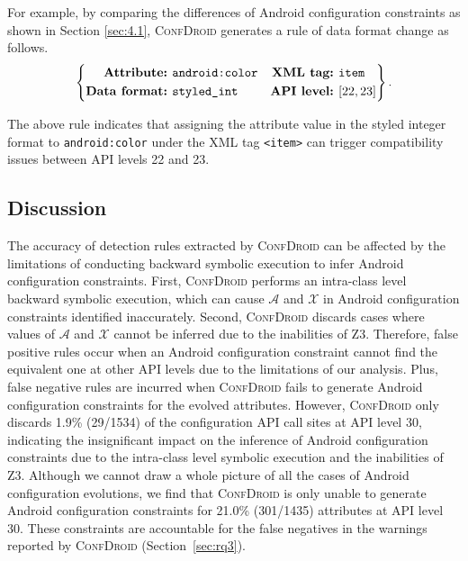 For example, by comparing the differences of Android configuration constraints as shown in Section \ref{sec:4.1}, 
\textsc{ConfDroid} generates a rule of data format change as follows.
$$ \left\{
\begin{aligned}
	\textbf{Attribute:\,\,} & \texttt{android:color}&
	\textbf{XML tag:\,\,} & \texttt{item} \\
	\textbf{Data format:\,\,} & \texttt{styled\_int}&
	\textbf{API level:\,\,} & [22,23] \\
\end{aligned}
\right\}.
$$

The above rule indicates that assigning the attribute value in the styled integer format to
\texttt{android:color} under the XML tag \texttt{<item>} can trigger
compatibility issues between API levels 22 and 23.

\subsection{Discussion}
\label{sec:discussion}
The accuracy of detection rules extracted by \textsc{ConfDroid} can be affected by the limitations of conducting backward symbolic execution to infer Android configuration constraints.
First, \textsc{ConfDroid} performs an intra-class level backward symbolic execution, which can cause $\mathcal{A}$ and $\mathcal{X}$ in Android configuration constraints identified inaccurately.
Second, \textsc{ConfDroid} discards cases where  values of $\mathcal{A}$ and $\mathcal{X}$ cannot be inferred due to the inabilities of Z3.
Therefore, false positive rules occur when an Android configuration constraint cannot find the equivalent one at other API levels due to the limitations of our analysis.
Plus, false negative rules are incurred when \textsc{ConfDroid} fails to generate Android configuration constraints for the evolved attributes.
However, \textsc{ConfDroid} only discards 1.9\% (29/1534) of the configuration API
call sites at API level 30, indicating the
insignificant impact on the inference of Android configuration constraints due
to the intra-class level symbolic execution and the inabilities of Z3.
Although we cannot draw a whole picture of all the cases of Android
configuration evolutions, we find that \textsc{ConfDroid} is only unable to
generate Android configuration constraints for 21.0\% (301/1435) attributes at
API level 30. These constraints are accountable for the false negatives in the
warnings reported by \textsc{ConfDroid} (Section~\ref{sec:rq3}).

